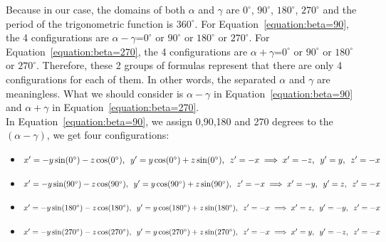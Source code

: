 Because in our case, the domains of both $\alpha$ and $\gamma$ are $0^{\circ}$, $90^{\circ}$, $180^{\circ}$, $270^{\circ}$ and the period of the trigonometric function is $360^{\circ}$. For Equation~\ref{equation:beta=90}, the 4 configurations are $\alpha-\gamma$=$0^{\circ}$ or $90^{\circ}$ or $180^{\circ}$ or $270^{\circ}$. For Equation~\ref{equation:beta=270}, the 4 configurations are $\alpha+\gamma$=$0^{\circ}$ or $90^{\circ}$ or $180^{\circ}$ or $270^{\circ}$.
Therefore, these 2 groups of formulas represent that there are only 4 configurations for each of them. In other words, the separated $\alpha$ and $\gamma$ are meaningless. What we should consider is $\alpha-\gamma$ in Equation~\ref{equation:beta=90} and $\alpha+\gamma$ in Equation~\ref{equation:beta=270}. 
\\In Equation~\ref{equation:beta=90}, we assign 0,90,180 and 270 degrees to the $(\alpha-\gamma)$, we get four configurations:
\begin{itemize}
  \item  $x'=-y\sin(0^{\circ})-z\cos(0^{\circ}),\hspace{5pt} y'=y\cos(0^{\circ})+z\sin(0^{\circ}),\hspace{5pt} z'=-x \\\implies x'=-z,\hspace{5pt} y'=y,\hspace{5pt} z'=-x$
  \item  $x'=-y\sin(90^{\circ})-z\cos(90^{\circ}), \hspace{5pt} y'=y\cos(90^{\circ})+z\sin(90^{\circ}), \hspace{5pt} z'=-x\\\implies x'=-y,\hspace{5pt} y'=z,\hspace{5pt} z'=-x$
  \item  $x'=-y\sin(180^{\circ})-z\cos(180^{\circ}), \hspace{5pt} y'=y\cos(180^{\circ})+z\sin(180^{\circ}), \hspace{5pt} z'=-x\\\implies x'=z,\hspace{5pt} y'=-y,\hspace{5pt} z'=-x$
  \item  $x'=-y\sin(270^{\circ})-z\cos(270^{\circ}), \hspace{5pt} y'=y\cos(270^{\circ})+z\sin(270^{\circ}), \hspace{5pt} z'=-x\\\implies x'=y, \hspace{5pt}y'=-z,\hspace{5pt} z'=-x$
  \label{3Drotation24situations1}
\end{itemize}
